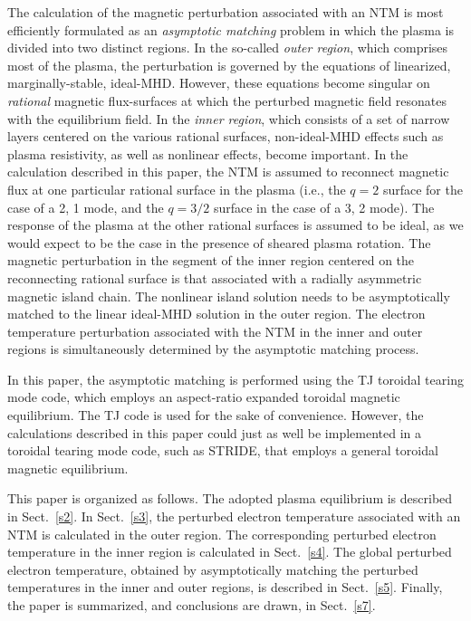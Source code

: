 \documentclass[12pt,prb,aps]{revtex4-1}
\begin{document}
The calculation of the  magnetic perturbation associated with an NTM is most efficiently formulated as an {\em asymptotic matching}\/ problem in which the  plasma is  divided into two distinct regions.\cite{tear1,tear2,tear3,tear4,tear5,tear6,tear7,tear8,tear9,tear10}    In the so-called {\em outer region}, which comprises most
of the plasma, the perturbation is governed by the equations of linearized, marginally-stable, ideal-MHD.
However, these equations become singular on   {\em rational}\/ magnetic flux-surfaces at which the perturbed magnetic field resonates with the equilibrium field. In the {\em inner region}, which
consists of a set of narrow layers centered on the various rational surfaces, non-ideal-MHD effects such as plasma resistivity, as well as nonlinear effects,  become important. 
 In the calculation described in this paper, the NTM is assumed to reconnect magnetic flux at one particular rational surface in the plasma (i.e., the
 $q=2$ surface for the case of a 2, 1 mode, and the $q=3/2$ surface in the case of a 3, 2 mode). The response of the plasma at the
 other rational surfaces is assumed to be ideal, as we would expect to be the case in the presence of sheared plasma rotation.\cite{tear5}
The magnetic perturbation in the segment of the inner region centered on the reconnecting rational surface is that associated with a radially asymmetric magnetic island chain.\cite{ntm1,island}
The nonlinear island solution needs to be asymptotically matched to the linear ideal-MHD solution in the outer region. The
electron temperature perturbation associated with the NTM in the inner and outer regions is simultaneously  determined by the asymptotic matching process. 

In this paper, the asymptotic matching is performed using the TJ toroidal tearing mode code,\cite{tear9,tear10}  which employs an aspect-ratio
expanded toroidal magnetic equilibrium.\cite{exp} The TJ code is used for the sake of convenience. However, the calculations described in this paper
could just as well be implemented in a toroidal tearing mode code, such as STRIDE,\cite{tear7,tear8} that employs a general toroidal magnetic 
equilibrium. 

This paper is organized as follows. The adopted plasma equilibrium is described in Sect.~\ref{s2}.  In Sect.~\ref{s3}, the perturbed electron temperature associated with  an NTM is calculated in the outer region. The corresponding perturbed electron temperature  in the inner region is calculated in Sect.~\ref{s4}. The
global perturbed electron temperature, obtained by asymptotically matching the perturbed temperatures  in  the inner and outer regions, is
described in Sect.~\ref{s5}. 
 Finally, the paper is summarized, and conclusions are drawn, in Sect.~\ref{s7}. 
\end{document}
